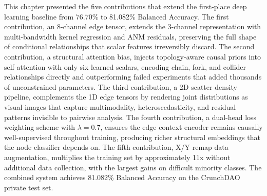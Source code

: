 This chapter presented the five contributions that extend the first-place deep learning baseline from 76.70\% to 81.082\% Balanced Accuracy. The first contribution, an 8-channel edge tensor, extends the 3-channel representation with multi-bandwidth kernel regression and ANM residuals, preserving the full shape of conditional relationships that scalar features irreversibly discard. The second contribution, a structural attention bias, injects topology-aware causal priors into self-attention with only six learned scalars, encoding chain, fork, and collider relationships directly and outperforming failed experiments that added thousands of unconstrained parameters. The third contribution, a 2D scatter density pipeline, complements the 1D edge tensors by rendering joint distributions as visual images that capture multimodality, heteroscedasticity, and residual patterns invisible to pairwise analysis. The fourth contribution, a dual-head loss weighting scheme with $\lambda = 0.7$, ensures the edge context encoder remains causally well-supervised throughout training, producing richer structural embeddings that the node classifier depends on. The fifth contribution, X/Y remap data augmentation, multiplies the training set by approximately 11x without additional data collection, with the largest gains on difficult minority classes. The combined system achieves 81.082\% Balanced Accuracy on the CrunchDAO private test set.